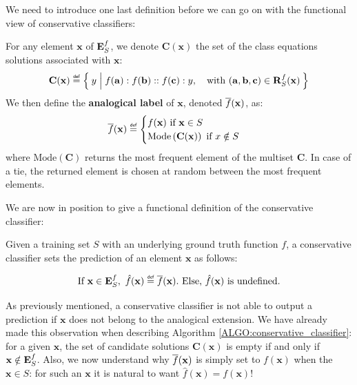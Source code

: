 We need to introduce one last definition before we can go on with the
functional view of conservative classifiers:

\begin{definition}
  \label{DEF:analogical_label}
  For any element $\mathbf{x}$ of $\mathbf{E}_{S}^{f}$, we denote $\mathbf{C}(\mathbf{x})$
  the set of the class equations solutions associated with $\mathbf{x}$:
  $$\mathbf{C}(\mathbf{x}) \eqdef \Set{y | f(\mathbf{a}) : f(\mathbf{b}) ::
  f(\mathbf{c}) :y, \quad \text{with }(\mathbf{a}, \mathbf{b}, \mathbf{c}) \in \rsfx}$$
  We then define the \textbf{analogical
  label} of $\mathbf{x}$, denoted $\overline{f}(\mathbf{x})$, as:
  $$\albl{\mathbf{x}} \eqdef
  \begin{cases}
    f(\mathbf{x}) \text{ if } \mathbf{x} \in S\\
    \text{Mode} \left(\mathbf{C}(\mathbf{x})\right) \text{ if
    } x \notin S
  \end{cases}
  $$
  where $\text{Mode}(\mathbf{C})$ returns the most frequent element of the multiset
$\mathbf{C}$. In case of a tie, the returned element is chosen at random between
the most frequent elements.
\end{definition}

We are now in position to give a functional definition of the conservative
classifier:

\begin{definition}
  \label{DEF:conservative_classifier}
  Given a training set $S$ with an underlying ground truth function $f$,
  a conservative classifier sets the prediction of an element $\mathbf{x}$ as
  follows:

  $$\text{If } \mathbf{x} \in \esf, ~ \hat{f}(\mathbf{x}) \eqdef \albl{\mathbf{x}}.
  \text{ Else, } \hat{f}(\mathbf{x}) \text{ is undefined.}$$
\end{definition}

As previously mentioned, a conservative classifier is not able to output a
prediction if $\mathbf{x}$ does not belong to the analogical extension. We have
already made this observation when describing Algorithm
\ref{ALGO:conservative_classifier}: for a given $\mathbf{x}$, the set of
candidate solutions $\mathbf{C}(\mathbf{x})$ is empty if and only if
$\mathbf{x} \notin \mathbf{E}_{S}^{f}$.  Also, we now understand why $\overline{f}(\mathbf{x})$ is
simply set to $f(\mathbf{x})$ when the $\mathbf{x} \in S$: for such an
$\mathbf{x}$ it is natural to want $\hat{f}(\mathbf{x}) = f(\mathbf{x})$!

